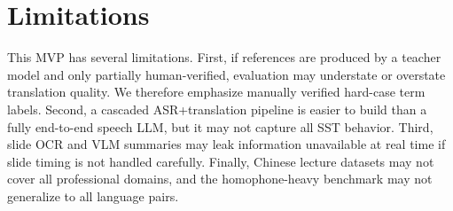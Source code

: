 \section{Limitations}

This MVP has several limitations.  First, if references are produced by a teacher model and only partially human-verified, evaluation may understate or overstate translation quality.  We therefore emphasize manually verified hard-case term labels.  Second, a cascaded ASR+translation pipeline is easier to build than a fully end-to-end speech LLM, but it may not capture all SST behavior.  Third, slide OCR and VLM summaries may leak information unavailable at real time if slide timing is not handled carefully.  Finally, Chinese lecture datasets may not cover all professional domains, and the homophone-heavy benchmark may not generalize to all language pairs.

